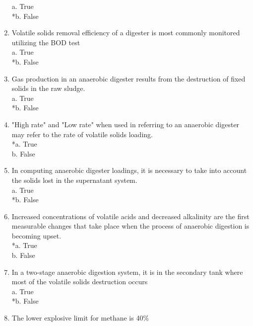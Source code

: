 \begin{enumerate}
a. True \\
*b. False \\

\item  Volatile solids removal efficiency of a digester is most commonly monitored utilizing the BOD test\\

a. True \\
*b. False \\

\item  Gas production in an anaerobic digester results from the destruction of fixed solids in the raw sludge. \\

a. True \\
*b. False \\

\item  "High rate" and "Low rate" when used in referring to an anaerobic digester may refer to the rate of volatile solids loading. \\

*a. True \\
b. False \\

\item  In computing anaerobic digester loadings, it is necessary to take into account the solids lost in the supernatant system. \\

a. True \\
*b. False \\

\item  Increased concentrations of volatile acids and decreased alkalinity are the first measurable changes that take place when the process of anaerobic digestion is becoming upset. \\

*a. True \\
b. False \\

\item  In a two-stage anaerobic digestion system, it is in the secondary tank where most of the volatile solids destruction occurs \\

a. True \\
*b. False \\

\item  The lower explosive limit for methane is 40\% \\


\end{enumerate}
